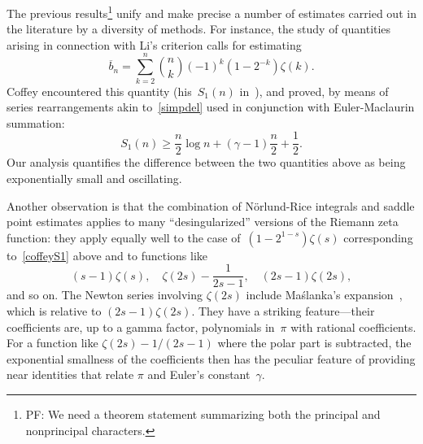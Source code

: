 \documentclass{amsart}
\begin{document}

\begin{comment}
TODO -- The Hurwitz zeta can be avoided entirely by working directly
with the functional equation for the L-functions, as given by Apostol,
Chapter 12, Theorem 12.11. The direct form seems to imply some sort
of result/constraint on the $p\ne1$ terms in the expansion. It also
suggests that most of the deriviation above could be made clearer
by assuming a generic functional equation, and stating results in
terms of that. (e.g. assume Selberg-class type functional equation). 
\end{comment}

\smallskip
The previous results\footnote{%
	PF: We need a theorem statement summarizing both the principal and nonprincipal
	characters.}
unify and make precise a number of estimates carried out in the literature by a diversity
of methods. For instance, the study of quantities arising in connection with Li's criterion
calls for estimating
\begin{equation}\label{coffeyS1}
\overline{b}_n=\sum_{k=2}^n \binom{n}{k}(-1)^k(1-2^{-k})\zeta(k).
\end{equation}
Coffey encountered this quantity (his~$S_1(n)$ in~\cite{Coffey05}),
and proved, by means of series rearrangements akin to~\eqref{simpdel}
used in conjunction with Euler-Maclaurin summation:
\begin{equation}\label{coffeyineq}
S_1(n)\ge \frac{n}{2}\log n+(\gamma-1)\frac{n}{2}+\frac12.
\end{equation}
Our analysis quantifies  the difference between the two quantities above as
being exponentially small and oscillating.

Another observation is that the combination of N\"orlund-Rice integrals
and saddle point estimates applies to many ``desingularized'' versions of 
the Riemann zeta function: they apply equally well to
the case of~$(1-2^{1-s})\zeta(s)$ corresponding to~\eqref{coffeyS1} above
and to functions like
\[
(s-1)\zeta(s), \quad
\zeta(2s)-\frac{1}{2s-1},\quad
(2s-1)\zeta(2s),
\]
and so on. The 
Newton series involving $\zeta(2s)$ include Ma{\'s}lanka's expansion~\cite{Maslanka01}, which is
relative to $(2s-1)\zeta(2s)$.
They have a striking feature---their coefficients are, up to a gamma factor,
polynomials in~$\pi$ with rational coefficients. 
For a function like $\zeta(2s)-1/(2s-1)$ where the polar part is subtracted,
the exponential smallness of the coefficients
then has the peculiar feature of providing near identities that relate $\pi$ and
Euler's constant~$\gamma$.








\end{document}
